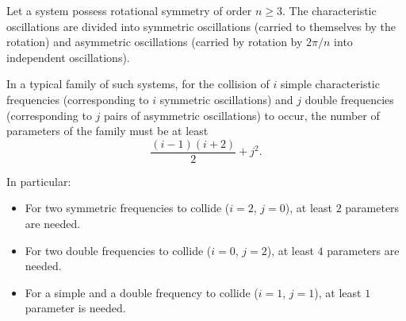 Let a system possess rotational symmetry of order $n \geq 3$. The characteristic oscillations are divided into symmetric oscillations (carried to themselves by the rotation) and asymmetric oscillations (carried by rotation by $2\pi/n$ into independent oscillations).

In a typical family of such systems, for the collision of $i$ simple characteristic frequencies (corresponding to $i$ symmetric oscillations) and $j$ double frequencies (corresponding to $j$ pairs of asymmetric oscillations) to occur, the number of parameters of the family must be at least
$$\frac{(i-1)(i+2)}{2} + j^{2}.$$

In particular:
\begin{itemize}
\item For two symmetric frequencies to collide ($i=2$, $j=0$), at least $2$ parameters are needed.
\item For two double frequencies to collide ($i=0$, $j=2$), at least $4$ parameters are needed.
\item For a simple and a double frequency to collide ($i=1$, $j=1$), at least $1$ parameter is needed.
\end{itemize}

